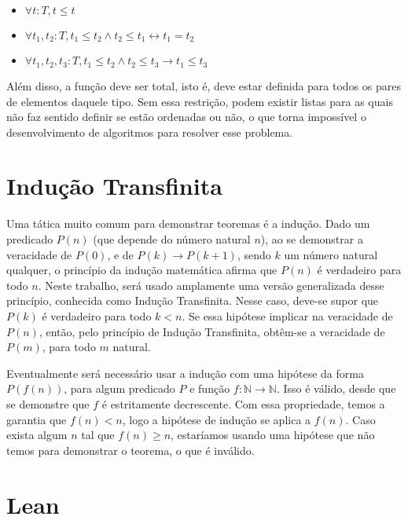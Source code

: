 \documentclass[12pt, oneside, a4paper,english,brazil]{abntex2}
\begin{document}
\begin{itemize}
  \item $\forall t : T, t \le t$
  \item $\forall t_{1}, t_{2} : T, t_{1} \le t_{2} \wedge t_{2} \le t_{1} \leftrightarrow t_{1} = t_{2}$
  \item $\forall t_{1}, t_{2}, t_{3} : T, t_{1} \le t_{2} \wedge t_{2} \le t_{3} \rightarrow t_{1} \le t_{3}$
\end{itemize}

\qquad Al\'em disso, a fun\c{c}\~ao deve ser total, isto \'e, deve estar definida para todos os pares de
elementos daquele tipo. Sem essa restri\c{c}\~ao, podem existir listas para as quais n\~ao faz sentido
definir se est\~ao ordenadas ou n\~ao, o que torna imposs\'ivel o desenvolvimento de algoritmos para resolver
esse problema.

\section{Indu\c{c}\~ao Transfinita}

\qquad Uma t\'atica muito comum para demonstrar teoremas \'e a indu\c{c}\~ao. Dado um predicado $P(n)$ (que
depende do n\'umero natural $n$), ao se demonstrar a veracidade de $P(0)$, e de $P(k) \rightarrow P(k + 1)$,
sendo $k$ um n\'umero natural qualquer, o princ\'ipio da indu\c{c}\~ao matem\'atica afirma que $P(n)$ \'e
verdadeiro para todo $n$. Neste trabalho, ser\'a usado amplamente uma vers\~ao generalizada desse
princ\'ipio, conhecida como Indu\c{c}\~ao Transfinita. Nesse caso, deve-se supor que $P(k)$ \'e verdadeiro
para todo $k < n$. Se essa hip\'otese implicar na veracidade de $P(n)$, ent\~ao, pelo princ\'ipio de
Indu\c{c}\~ao Transfinita, obt\^em-se a veracidade de $P(m)$, para todo $m$ natural.

\qquad Eventualmente ser\'a necess\'ario usar a indu\c{c}\~ao com uma hip\'otese da forma $P(f(n))$, para
algum predicado $P$ e fun\c{c}\~ao $f : \mathbb{N} \rightarrow \mathbb{N}$. Isso \'e v\'alido, desde que se
demonstre que $f$ \'e estritamente decrescente. Com essa propriedade, temos a garantia que $f(n) < n$,
logo a hip\'otese de indu\c{c}\~ao se aplica a $f(n)$. Caso exista algum $n$ tal que $f(n) \geq n$,
estar\'iamos usando uma hip\'otese que n\~ao temos para demonstrar o teorema, o que \'e inv\'alido.

\section{Lean}
\end{document}
